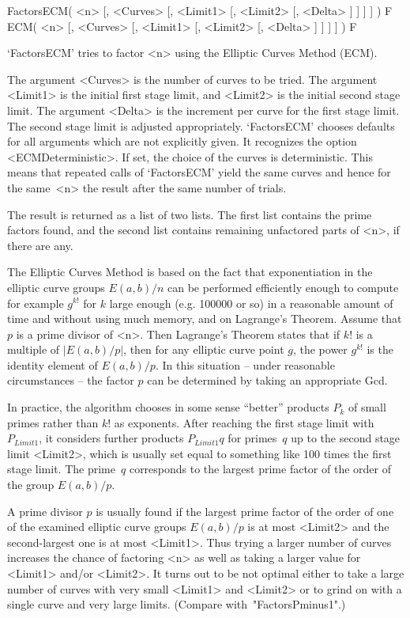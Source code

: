 
\>FactorsECM( <n> [, <Curves> [, <Limit1> [, <Limit2> [, <Delta> ] ] ] ] ) F
\>ECM( <n> [, <Curves> [, <Limit1> [, <Limit2> [, <Delta> ] ] ] ] ) F

`FactorsECM' tries to factor <n> using the Elliptic Curves Method (ECM).

The argument <Curves> is the number of curves to be tried.
The argument <Limit1> is the initial
first stage limit, and
<Limit2> is the initial
second stage limit.
The argument <Delta> is the increment per curve for the first stage
limit. The second stage limit is adjusted appropriately.
`FactorsECM' chooses defaults for all arguments which are not
explicitly given.
It recognizes the option <ECMDeterministic>.
If set, the choice of the curves is deterministic.
This means that repeated calls of `FactorsECM' yield the same curves
and hence for the same~<n> the result after the same number of trials.

The result is returned as a list of two lists. The first list
contains the prime factors found, and the second list contains
remaining unfactored parts of <n>, if there are any.

The Elliptic Curves Method is based on the fact that exponentiation
in the
elliptic curve groups
$E(a,b)/n$ can be performed efficiently enough
to compute for example $g^{k!}$ for $k$ large enough
(e.g. 100000 or so) in a reasonable amount of time and without
using much memory, and on Lagrange's Theorem.
Assume that $p$ is a prime divisor of <n>.
Then Lagrange's Theorem states that if $k!$ is a multiple of $|E(a,b)/p|$,
then for any
elliptic curve point $g$, the power $g^{k!}$ is the identity element of
$E(a,b)/p$.
In this situation -- under reasonable circumstances -- the factor $p$
can be determined by taking an appropriate Gcd.

In practice, the algorithm chooses in some sense ``better''
products $P_k$ of small primes rather than $k!$ as exponents.
After reaching the first stage limit with $P_{Limit1}$, it
considers further products $P_{Limit1}q$ for primes~$q$ up to
the second stage limit <Limit2>, which is usually set equal to
something like 100 times the first stage limit.
The prime~$q$ corresponds to the largest prime factor of the
order of the group $E(a,b)/p$.

A prime divisor $p$ is usually found if the largest prime factor
of the order of one of the examined elliptic curve groups $E(a,b)/p$
is at most <Limit2> and the second-largest one is at most <Limit1>.
Thus trying a larger number of curves increases the chance of
factoring <n> as well as taking a larger value
for <Limit1> and/or <Limit2>. It turns out to be not optimal either
to take a large number of curves with very small <Limit1> and <Limit2>
or to grind on with a single curve and very large limits.
(Compare with~"FactorsPminus1".)

